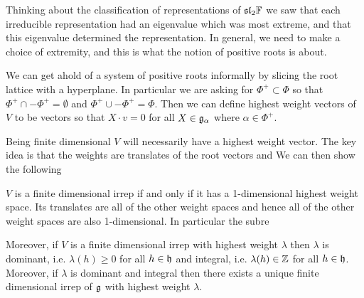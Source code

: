 \documentclass[12pt]{article}
\begin{document}
Thinking about the classification of representations of $\mathfrak{sl}_2\mathbb{F}$ we saw that each irreducible
representation had an eigenvalue which was most extreme, and that this eigenvalue determined
the representation. In general, we need to make a choice of extremity, and this is what the notion
of positive roots is about.

\hfill

We can get ahold of a system of positive roots informally by slicing the root lattice with a hyperplane.
In particular we are asking for $\Phi^+\subset \Phi$
so that $\Phi^+\cap -\Phi^+ = \emptyset$ and $\Phi^+\cup -\Phi^+ = \Phi$. Then we can define highest 
weight vectors of $V$ to be vectors so that $X\cdot v = 0$ for all $X\in\mathfrak{g}_\alpha$ where $\alpha\in\Phi^+$.

\hfill

Being finite dimensional $V$ will necessarily have a highest weight vector. The key idea is that
the weights are translates of the root vectors and 
 We can then show the following

\hfill

$V$ is a finite dimensional irrep if and only if it has a 1-dimensional highest weight space.
Its translates are all of the other weight spaces and hence all of the other weight spaces are also 1-dimensional.
In particular the subre



Moreover, if $V$ is a finite dimensional irrep with highest weight $\lambda$ then $\lambda$ is dominant, i.e. $\lambda(h)\geq 0$ for all $h\in\mathfrak{h}$
and integral, i.e. $\lambda(h)\in\mathbb{Z}$ for all $h\in\mathfrak{h}$. Moreover, if $\lambda$ is dominant and integral then there exists 
a unique finite dimensional irrep of $\mathfrak{g}$ with highest weight $\lambda$.

\end{document}
